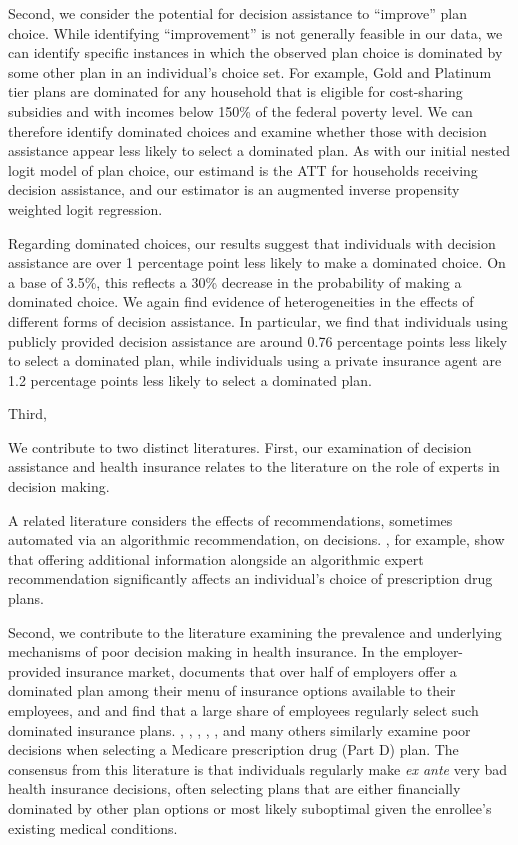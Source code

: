 \documentclass[12pt]{article}
\begin{document}
Second, we consider the potential for decision assistance to ``improve'' plan choice. While identifying ``improvement'' is not generally feasible in our data, we can identify specific instances in which the observed plan choice is dominated by some other plan in an individual's choice set. For example, Gold and Platinum tier plans are dominated for any household that is eligible for cost-sharing subsidies and with incomes below 150\% of the federal poverty level. We can therefore identify dominated choices and examine whether those with decision assistance appear less likely to select a dominated plan. As with our initial nested logit model of plan choice, our estimand is the ATT for households receiving decision assistance, and our estimator is an augmented inverse propensity weighted logit regression. 

Regarding dominated choices, our results suggest that individuals with decision assistance are over 1 percentage point less likely to make a dominated choice. On a base of 3.5\%, this reflects a 30\% decrease in the probability of making a dominated choice. We again find evidence of heterogeneities in the effects of different forms of decision assistance. In particular, we find that individuals using publicly provided decision assistance are around 0.76 percentage points less likely to select a dominated plan, while individuals using a private insurance agent are 1.2 percentage points less likely to select a dominated plan.

Third, 

We contribute to two distinct literatures. First, our examination of decision assistance and health insurance relates to the literature on the role of experts in decision making.

A related literature considers the effects of recommendations, sometimes automated via an algorithmic recommendation, on decisions. \cite{bundorf2019}, for example, show that offering additional information alongside an algorithmic expert recommendation significantly affects an individual's choice of prescription drug plans.

Second, we contribute to the literature examining the prevalence and underlying mechanisms of poor decision making in health insurance. In the employer-provided insurance market, \cite{liu2021} documents that over half of employers offer a dominated plan among their menu of insurance options available to their employees, and \cite{sinaiko2011} and \cite{bhargava2017} find that a large share of employees regularly select such dominated insurance plans. \cite{abaluck2011}, \cite{ketcham2012}, \cite{zhou2012}, \cite{heiss2013}, \cite{gruber2017}, \cite{ho2017rand} and many others similarly examine poor decisions when selecting a Medicare prescription drug (Part D) plan. The consensus from this literature is that individuals regularly make \textit{ex ante} very bad health insurance decisions, often selecting plans that are either financially dominated by other plan options or most likely suboptimal given the enrollee's existing medical conditions.
\end{document}
